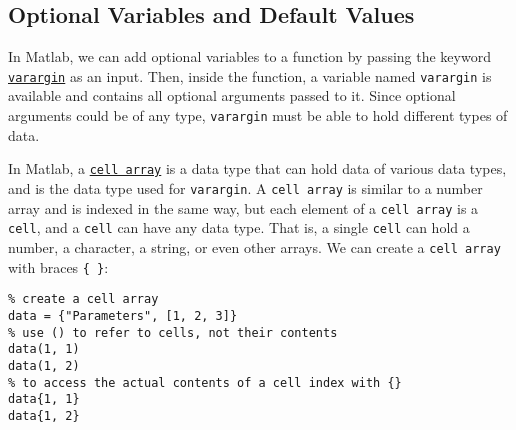 \documentclass[12pt, a4paper]{article}
\begin{document}
\subsection{Optional Variables and Default Values}
\label{sec:org73aac64}
In Matlab, we can add optional variables to a function by passing the keyword \href{https://www.mathworks.com/help/matlab/ref/varargin.html}{\texttt{varargin}} as an input.
Then, inside the function, a variable named \texttt{varargin} is available and contains all optional arguments passed to it.
Since optional arguments could be of any type, \texttt{varargin} must be able to hold different types of data.

In Matlab, a \href{https://www.mathworks.com/help/matlab/ref/cell.html?s\_tid=doc\_ta}{\texttt{cell array}} is a data type that can hold data of various data types, and is the data type used for \texttt{varargin}.
A \texttt{cell array} is similar to a number array and is indexed in the same way, but each element of a \texttt{cell array} is a \texttt{cell}, and a \texttt{cell} can have any data type.
That is, a single \texttt{cell} can hold a number, a character, a string, or even other arrays.
We can create a \texttt{cell array} with braces \texttt{\{ \}}:
\lstset{language=matlab,label= ,caption= ,captionpos=b,firstnumber=1,numbers=left,style=Matlab-editor}
\begin{lstlisting}
% create a cell array
data = {"Parameters", [1, 2, 3]}
% use () to refer to cells, not their contents
data(1, 1)
data(1, 2)
% to access the actual contents of a cell index with {}
data{1, 1}
data{1, 2}
\end{lstlisting}
\end{document}
